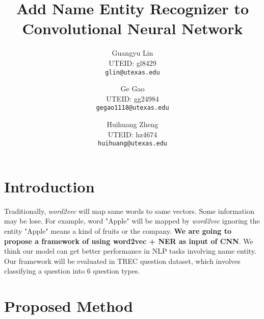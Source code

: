 \documentclass[10pt,twocolumn,letterpaper]{article}
\begin{document}
\title{Add Name Entity Recognizer to Convolutional Neural Network }

\author{
Guangyu Lin\\
UTEID: gl8429\\
{\tt\small glin@utexas.edu} \\
\and
Ge Gao\\
UTEID: gg24984\\
{\tt\small gegao1118@utexas.edu} \\
\and
Huihuang Zheng\\
UTEID: hz4674\\
{\tt\small huihuang@utexas.edu} \\
}

\maketitle



\section{Introduction}
Traditionally, \textit{word2vec} \cite{mikolov2013efficient} will map same words to same vectors. Some information may be lose. For example, word "Apple" will be mapped by \textit{word2vec} ignoring the entity "Apple" means a kind of fruits or the company. \textbf{We are going to propose a framework of using word2vec + NER as input of CNN}. We think our model can get better performance in NLP tasks involving name entity. Our framework will be evaluated in TREC \cite{li2006learning} question dataset, which involves classifying a question into 6 question types.

\section{Proposed Method}
\end{document}
